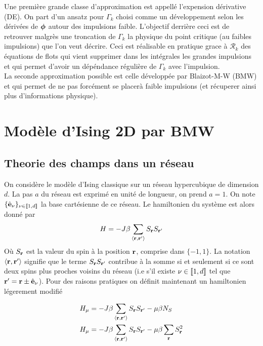 \documentclass[10pt]{article}
\begin{document}
\begin{multicols}{2}
Une première grande classe d'approximation est appellé l'expension dérivative (DE). On part d'un ansatz pour $\Gamma_k$ choisi comme un développement selon les dérivées de $\boldsymbol{ \phi}$ autour des impulsions faible. L'objectif derrière ceci est de retrouver malgrès une troncation de $\Gamma_k$ la physique du point critique (au faibles impulsions) que l'on veut décrire. Ceci est réalisable en pratique grace à $\mathcal{R}_k$ des équations de flots qui vient supprimer dans les intégrales les grandes impulsions et qui permet d'avoir un dépéndance régulière de $\Gamma_k$ avec l'impulsion. \\

La seconde approximation possible est celle développée par Blaizot-M-W (BMW) et qui permet de ne pas forcément se placerà faible impulsions (et récuperer ainsi plus d'informations physique). 

\newpage

\section{Modèle d'Ising 2D par BMW}

\subsection{Theorie des champs dans un réseau}

On considère le modèle d'Ising classique sur un réseau hypercubique de dimension $d$. La pas $a$ du réseau est exprimé en unité de longueur, on prend $a=1$. On note $\{\hat{\mathbf{e}}_\nu\}_{\nu\in \llbracket 1,d \rrbracket }$ la base cartésienne de ce réseau. Le hamiltonien du système est alors donné par
\begin{equation}
H = -J\beta \sum_{\left<{\bf r}, {\bf r}'\right>}S_{\bf r} S_{{\bf r}'}
\end{equation}
Où $S_{\bf r}$ est la valeur du spin à la position ${\bf r}$, comprise dans $\{-1,1\}$. La notation $\left<{\bf r}, {\bf r}'\right>$ signifie que le terme $S_{\bf r} S_{{\bf r}'}$ contribue à la somme si et seulement si ce sont deux spins plus proches voisins du réseau (i.e s'il existe $\nu \in  \llbracket 1,d \rrbracket $ tel que ${\bf r}' = {\bf r} \pm \hat{\mathbf{e}}_\nu$). Pour des raisons pratiques on définit maintenant un hamiltonien légerement modifié

\begin{align}
  H_\mu &= -J\beta \sum_{\left<{\bf r}, {\bf r}'\right>}S_{\bf r} S_{{\bf r}'} - \mu \beta N_S \\
  H_\mu  &= -J\beta \sum_{\left<{\bf r}, {\bf r}'\right>}S_{\bf r} S_{{\bf r}'} - \mu \beta \sum_{\bf r} S_{\bf r}^2 
\end{align}


\end{multicols}
\end{document}
